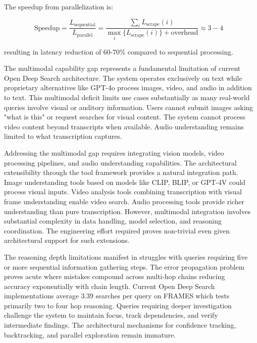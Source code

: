 The speedup from parallelization is:

\begin{equation}
\text{Speedup} = \frac{L_{\text{sequential}}}{L_{\text{parallel}}} = \frac{\sum_{i} L_{\text{scrape}}(i)}{\max_{i} \{L_{\text{scrape}}(i)\} + \text{overhead}} \approx 3-4
\label{eq:parallel_speedup}
\end{equation}

resulting in latency reduction of 60-70\% compared to sequential processing.

The multimodal capability gap represents a fundamental limitation of current Open Deep Search architecture. The system operates exclusively on text while proprietary alternatives like GPT-4o process images, video, and audio in addition to text. This multimodal deficit limits use cases substantially as many real-world queries involve visual or auditory information. Users cannot submit images asking "what is this" or request searches for visual content. The system cannot process video content beyond transcripts when available. Audio understanding remains limited to what transcription captures.

Addressing the multimodal gap requires integrating vision models, video processing pipelines, and audio understanding capabilities. The architectural extensibility through the tool framework provides a natural integration path. Image understanding tools based on models like CLIP, BLIP, or GPT-4V could process visual inputs. Video analysis tools combining transcription with visual frame understanding enable video search. Audio processing tools provide richer understanding than pure transcription. However, multimodal integration involves substantial complexity in data handling, model selection, and reasoning coordination. The engineering effort required proves non-trivial even given architectural support for such extensions.

The reasoning depth limitations manifest in struggles with queries requiring five or more sequential information gathering steps. The error propagation problem proves acute where mistakes compound across multi-hop chains reducing accuracy exponentially with chain length. Current Open Deep Search implementations average 3.39 searches per query on FRAMES which tests primarily two to four hop reasoning. Queries requiring deeper investigation challenge the system to maintain focus, track dependencies, and verify intermediate findings. The architectural mechanisms for confidence tracking, backtracking, and parallel exploration remain immature.


